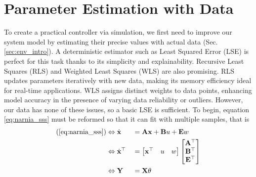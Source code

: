 \documentclass[../main.tex]{subfiles}
\begin{document}
\section{Parameter Estimation with Data} \label{sec:env_estim}
To create a practical controller via simulation, we first need to improve our system model by estimating their precise values with actual data (Sec. \ref{sec:env_intro}). A deterministic estimator such as Least Squared Error (LSE) is perfect for this task thanks to its simplicity and explainability. Recursive Least Squares (RLS) and Weighted Least Squares (WLS) are also promising. RLS updates parameters iteratively with new data, making its memory efficiency ideal for real-time applications. WLS assigns distinct weights to data points, enhancing model accuracy in the presence of varying data reliability or outliers. However, our data has none of these issues, so a basic LSE is sufficient. To begin, equation \ref{eq:narnia_sss} must be reformed so that it can fit with multiple samples, that is
\begin{alignat}{2}
    (\ref{eq:narnia_sss}) 
    &\Leftrightarrow
    \dot{\mathbf{x}} &&= \mathbf{Ax} + \mathbf{B}u + \mathbf{E}w \notag \\ 
    &\Leftrightarrow
    \dot{\mathbf{x}}^\top &&= \begin{bmatrix}
        \mathbf{x}^\top & u & w
    \end{bmatrix}\begin{bmatrix}
        \mathbf{A}^\top \\ \mathbf{B}^\top \\ \mathbf{E}^\top
    \end{bmatrix} \notag \\
    &\Leftrightarrow
    \mathbf{Y} &&= \mathbf{X}\theta
\label{eq:narnia_lse}
\end{alignat}
\end{document}
